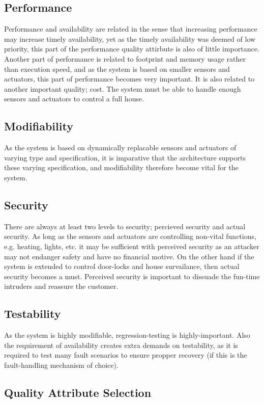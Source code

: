 \documentclass[a4paper,10pt]{article}
\begin{document}
\subsection{Performance}
Performance and availability are related in the sense that increasing performance may increase timely availability, yet as the timely availability was deemed of low priority, this part of the performance quality attirbute is also of little importance.
Another part of performance is related to footprint and memory usage rather than execution speed, and as the system is based on smaller sensors and actuators, this part of performance becomes very important. It is also related to another important quality; cost.
The system must be able to handle enough sensors and actuators to control a full house.
\subsection{Modifiability}
As the system is based on dynamically replacable sensors and actuators of varying type and specification, it is imparative that the architecture supports these varying specification, and modifiability therefore become vital for the system.
\subsection{Security}
There are always at least two levels to security; percieved security and actual security. As long as the sensors and actuators are controlling non-vital functions, e.g. heating, lights, etc. it may be sufficient with perceived security as an attacker may not endanger safety and have no financial motive. On the other hand if the system is extended to control door-locks and house survailance, then actual security becomes a must. Perceived security is important to dissuade the fun-time intruders and reassure the customer.
\subsection{Testability}
As the system is highly modifiable, regression-testing is highly-important. Also the requirement of availability creates extra demands on testability, as it is required to test many fault scenarios to ensure propper recovery (if this is the fault-handling mechanism of choice).

\subsection{Quality Attribute Selection}
\end{document}
